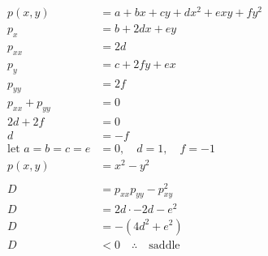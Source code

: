 \documentclass[../../HW07.tex]{subfiles}
\begin{document}
\begin{align*}
    p(x,y)              & = a + bx + cy + dx^{2} + exy + fy^{2}     \\
    p_{x}               & = b + 2dx + ey                            \\
    p_{xx}              & = 2d                                      \\
    p_{y}               & = c + 2fy + ex                            \\
    p_{yy}              & = 2f                                      \\
    p_{xx} + p_{yy}     & = 0                                       \\
    2d + 2f             & = 0                                       \\
    d                   & = -f                                      \\
    \text{let } a=b=c=e & =0,\quad d=1,\quad f=-1                   \\
    p(x,y)              & = x^{2} - y^{2}                           \\
    \\
    D                   & = p_{xx}p_{yy}-p_{xy}^{2}                 \\
    D                   & = 2d \cdot -2d - e^{2}                    \\
    D                   & = -\left( 4d^{2} + e^{2} \right)          \\
    D                   & < 0 \quad \therefore \quad \text{saddle}
\end{align*}
\end{document}
